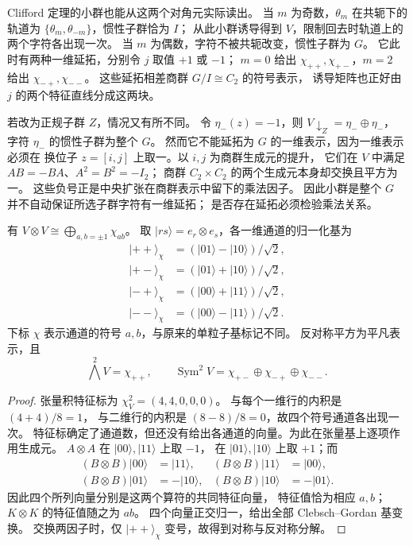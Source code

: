 Clifford 定理的小群也能从这两个对角元实际读出。
当 $m$ 为奇数，$\theta_m$ 在共轭下的轨道为
$\{\theta_m,\theta_{-m}\}$，惯性子群恰为 $I$；
从此小群诱导得到 $V$，限制回去时轨道上的两个字符各出现一次。
当 $m$ 为偶数，字符不被共轭改变，惯性子群为 $G$。
它此时有两种一维延拓，分别令 $j$ 取值 $+1$ 或 $-1$；
$m=0$ 给出 $\chi_{++},\chi_{+-}$，$m=2$ 给出 $\chi_{-+},\chi_{--}$。
这些延拓相差商群 $G/I\cong C_2$ 的符号表示，
诱导矩阵也正好由 $j$ 的两个特征直线分成这两块。

若改为正规子群 $Z$，情况又有所不同。
令 $\eta_-(z)=-1$，则 $V\downarrow_Z=\eta_-\oplus\eta_-$，
字符 $\eta_-$ 的惯性子群为整个 $G$。
然而它不能延拓为 $G$ 的一维表示，因为一维表示必须在
换位子 $z=[i,j]$ 上取一。以 $i,j$ 为商群生成元的提升，
它们在 $V$ 中满足 $AB=-BA$、$A^2=B^2=-I_2$；
商群 $C_2\times C_2$ 的两个生成元本身却交换且平方为一。
这些负号正是中央扩张在商群表示中留下的乘法因子。
因此小群是整个 $G$ 并不自动保证所选子群字符有一维延拓；
是否存在延拓必须检验乘法关系。

\begin{proposition}
\label{prop:q8-tensor-cg}
有 $V\otimes V\cong\bigoplus_{a,b=\pm1}\chi_{ab}$。
取 $|rs\rangle=e_r\otimes e_s$，各一维通道的归一化基为
\[
\begin{aligned}
|++\rangle_{\chi}&=(|01\rangle-|10\rangle)/\sqrt2,\\
|+-\rangle_{\chi}&=(|01\rangle+|10\rangle)/\sqrt2,\\
|-+\rangle_{\chi}&=(|00\rangle+|11\rangle)/\sqrt2,\\
|--\rangle_{\chi}&=(|00\rangle-|11\rangle)/\sqrt2.
\end{aligned}
\]
下标 $\chi$ 表示通道的符号 $a,b$，与原来的单粒子基标记不同。
反对称平方为平凡表示，且
\[
\bigwedge^2 V=\chi_{++},\qquad
\operatorname{Sym}^2V=\chi_{+-}\oplus\chi_{-+}\oplus\chi_{--}.
\]
\end{proposition}

\begin{proof}
张量积特征标为 $\chi_V^2=(4,4,0,0,0)$。
与每个一维行的内积是 $(4+4)/8=1$，
与二维行的内积是 $(8-8)/8=0$，故四个符号通道各出现一次。
特征标确定了通道数，但还没有给出各通道的向量。为此在张量基上逐项作用生成元。
$A\otimes A$ 在 $|00\rangle,|11\rangle$ 上取 $-1$，
在 $|01\rangle,|10\rangle$ 上取 $+1$；而
\[
\begin{aligned}
(B\otimes B)|00\rangle&=|11\rangle,&
(B\otimes B)|11\rangle&=|00\rangle,\\
(B\otimes B)|01\rangle&=-|10\rangle,&
(B\otimes B)|10\rangle&=-|01\rangle.
\end{aligned}
\]
因此四个所列向量分别是这两个算符的共同特征向量，
特征值恰为相应 $a,b$；$K\otimes K$ 的特征值随之为 $ab$。
四个向量正交归一，给出全部 Clebsch--Gordan 基变换。
交换两因子时，仅 $|++\rangle_\chi$ 变号，故得到对称与反对称分解。
\end{proof}

